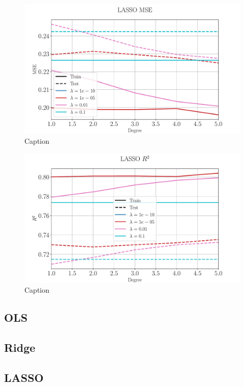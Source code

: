 \documentclass[%
reprint,
amsmath,amssymb,
aps,
pra,
]{revtex4-2}
\begin{document}
\begin{figure}[ht!]
	\centering
	\includegraphics[width=\linewidth]{Python/Figures/LASSO-MSE-degree.pdf}
	\caption{Caption}
	\label{fig:lasso_mse_degree}
\end{figure}
\begin{figure}[ht!]
\centering
\includegraphics[width=\linewidth]{Python/Figures/LASSO-R2-degree.pdf}
\caption{Caption}
\label{fig:lasso_r2_degree}
\end{figure}

\subsection{OLS}

\subsection{Ridge}

\subsection{LASSO}
\end{document}
